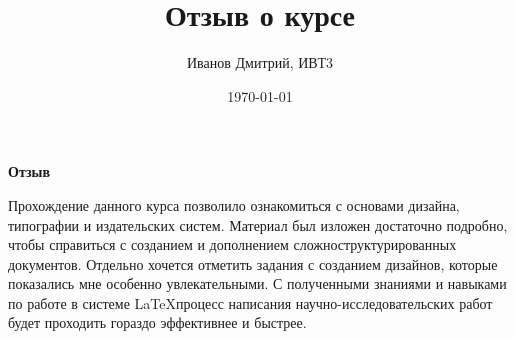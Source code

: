 \documentclass[a4paper,12pt]{article} %
\author{Иванов Дмитрий, ИВТ3}
\title{Отзыв о курсе}
\date{\today}
\begin{document}
\maketitle
\newpage

\textbf{Отзыв}

Прохождение данного курса позволило ознакомиться с основами дизайна, типографии и издательских систем. Материал был изложен достаточно подробно, чтобы справиться с созданием и дополнением сложноструктурированных документов. Отдельно хочется отметить задания с созданием дизайнов, которые показались мне особенно увлекательными. С полученными знаниями и навыками по работе в системе \LaTeX процесс написания научно-исследовательских работ будет проходить гораздо эффективнее и быстрее.
\end{document}
